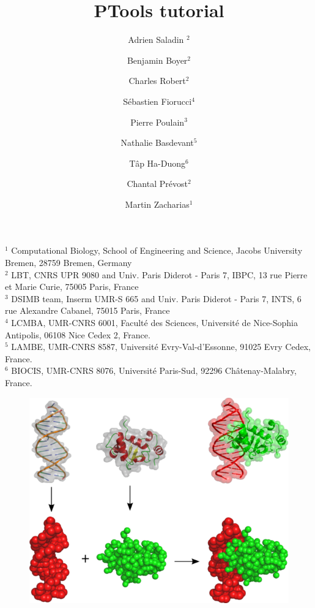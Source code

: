 \documentclass[12pt,a4paper]{article}
\begin{document}
\setlength{\parindent}{0pt}

\title{\bf PTools tutorial}

\author{Adrien Saladin $^{2}$
\and Benjamin Boyer$^{2}$
\and Charles Robert$^{2}$
\and S\'ebastien Fiorucci$^{4}$
\and Pierre Poulain$^3$
\and Nathalie Basdevant$^5$
\and T\^ap Ha-Duong$^6$
\and Chantal Pr\'evost$^2$
\and Martin Zacharias$^1$}

\maketitle

\thispagestyle{empty}

\noindent
{\scriptsize
$^1$ Computational Biology, School of Engineering and Science, Jacobs University Bremen, 28759 Bremen, Germany\\
$^2$ LBT, CNRS UPR 9080 and Univ. Paris Diderot - Paris 7, IBPC, 13 rue Pierre et Marie Curie, 75005 Paris, France   \\
$^3$ DSIMB team, Inserm UMR-S 665 and Univ. Paris Diderot - Paris 7, INTS,
6 rue Alexandre Cabanel, 75015 Paris, France   \\
$^4$ LCMBA, UMR-CNRS 6001, Facult\'e des Sciences, Universit\'e de Nice-Sophia Antipolis, 06108 Nice Cedex 2, France. \\
$^5$ LAMBE, UMR-CNRS 8587, Universit\'e Evry-Val-d'Essonne, 91025 Evry Cedex, France. \\
$^6$ BIOCIS, UMR-CNRS 8076, Universit\'e Paris-Sud, 92296 Ch\^atenay-Malabry, France. \\
}

\vspace*{1cm}

\begin{figure}[htbp]
\center
\includegraphics*[width=0.70\linewidth]{img/docking.png}
\end{figure}
\end{document}
